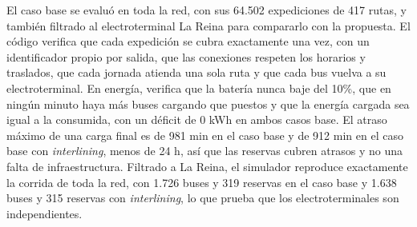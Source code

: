 El caso base se evaluó en toda la red, con sus 64.502 expediciones de 417 rutas, y también filtrado al electroterminal La Reina para compararlo con la propuesta. El código verifica que cada expedición se cubra exactamente una vez, con un identificador propio por salida, que las conexiones respeten los horarios y traslados, que cada jornada atienda una sola ruta y que cada bus vuelva a su electroterminal. En energía, verifica que la batería nunca baje del 10\%, que en ningún minuto haya más buses cargando que puestos y que la energía cargada sea igual a la consumida, con un déficit de 0 kWh en ambos casos base. El atraso máximo de una carga final es de 981 min en el caso base y de 912 min en el caso base con \textit{interlining}, menos de 24 h, así que las reservas cubren atrasos y no una falta de infraestructura. Filtrado a La Reina, el simulador reproduce exactamente la corrida de toda la red, con 1.726 buses y 319 reservas en el caso base y 1.638 buses y 315 reservas con \textit{interlining}, lo que prueba que los electroterminales son independientes.
